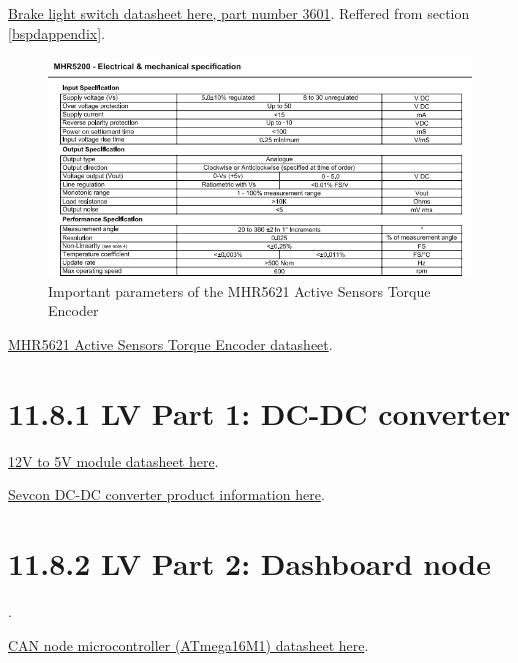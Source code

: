 \documentclass{article}
\begin{document}
\href{https://www.pegasusautoracing.com/2015/086.pdf}{Brake light switch datasheet here, part number 3601}. Reffered from section \ref{bspdappendix}.

\begin{figure}[H]
    \centering
    \includegraphics[width = 0.6 \textwidth]{activesensorsnip}
    \caption{Important parameters of the MHR5621 Active Sensors Torque Encoder}
    \label{torquesnip}
\end{figure}

\href{http://www.magni-tec.com/datasheet/WS-MHR5200.pdf}{MHR5621 Active Sensors Torque Encoder datasheet}.

\section*{11.8.1 LV Part 1: DC-DC converter}

\href{https://www.superbrightleds.com/moreinfo/bar-strip-accessories/12vdc-to-5vdc-voltage-converter-/1549/3652/#/tab/Specifications}{12V to 5V module datasheet here}.

\href{http://www.evdrives.com/product_p/vr-sevcon-7213.htm}{Sevcon DC-DC converter product information here}.

\section*{11.8.2 LV Part 2: Dashboard node}.

\href{http://www.atmel.com/images/8209s.pdf}{CAN node microcontroller (ATmega16M1) datasheet here}.

\end{document}
